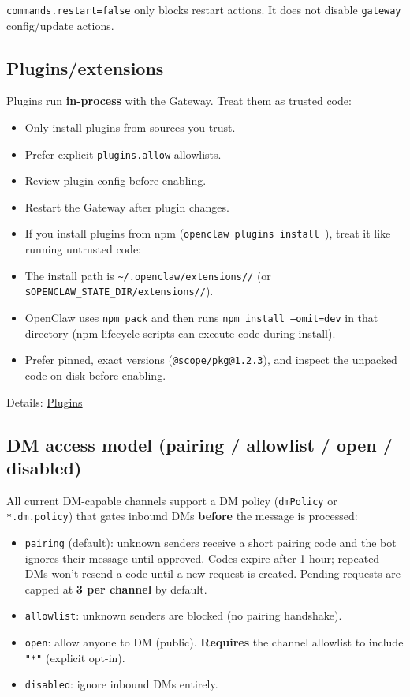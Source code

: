 \texttt{commands.restart=false} only blocks restart actions. It does not disable \texttt{gateway} config/update actions.

\subsection{Plugins/extensions}


Plugins run \textbf{in-process} with the Gateway. Treat them as trusted code:

\begin{itemize}
  \item Only install plugins from sources you trust.
  \item Prefer explicit \texttt{plugins.allow} allowlists.
  \item Review plugin config before enabling.
  \item Restart the Gateway after plugin changes.
  \item If you install plugins from npm (\texttt{openclaw plugins install }), treat it like running untrusted code:
  \item The install path is \texttt{\textasciitilde{}/.openclaw/extensions//} (or \texttt{\$OPENCLAW\_STATE\_DIR/extensions//}).
  \item OpenClaw uses \texttt{npm pack} and then runs \texttt{npm install --omit=dev} in that directory (npm lifecycle scripts can execute code during install).
  \item Prefer pinned, exact versions (\texttt{@scope/pkg@1.2.3}), and inspect the unpacked code on disk before enabling.
\end{itemize}


Details: \href{/tools/plugin}{Plugins}

\subsection{DM access model (pairing / allowlist / open / disabled)}


All current DM-capable channels support a DM policy (\texttt{dmPolicy} or \texttt{*.dm.policy}) that gates inbound DMs \textbf{before} the message is processed:

\begin{itemize}
  \item \texttt{pairing} (default): unknown senders receive a short pairing code and the bot ignores their message until approved. Codes expire after 1 hour; repeated DMs won’t resend a code until a new request is created. Pending requests are capped at \textbf{3 per channel} by default.
  \item \texttt{allowlist}: unknown senders are blocked (no pairing handshake).
  \item \texttt{open}: allow anyone to DM (public). \textbf{Requires} the channel allowlist to include \texttt{"*"} (explicit opt-in).
  \item \texttt{disabled}: ignore inbound DMs entirely.
\end{itemize}



